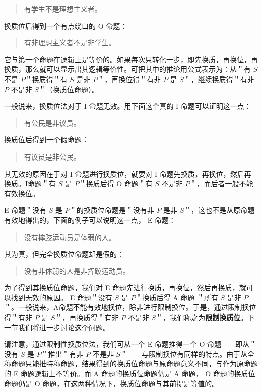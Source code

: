 \begin{quote}
有学生不是理想主义者。
\end{quote}

换质位后得到一个有点绕口的 O 命题：

\begin{quote}
有非理想主义者不是非学生。
\end{quote}

它与第一个命题在逻辑上是等价的。如果每次只转化一步，即先换质，再换位，再换质，那么就可以显示出其逻辑等价性。可把其中的推论用公式表示为：从＂有 $S$ 不是 $P$＂换质得＂有 $S$ 是非 $P$＂，再换位得＂有非 $P$ 是 $S$＂，继续换质得＂有非 $P$ 不是非 $S$＂（换质位命题）。

一般说来，换质位法对于 I 命题无效。用下面这个真的 I 命题可以证明这一点：

\begin{quote}
有公民是非议员。
\end{quote}

换质位后得到一个假命题：

\begin{quote}
有议员是非公民。
\end{quote}

其无效的原因在于对 I 命题进行换质位，就要对 I 命题先换质，再换位，然后再换质。I命题＂有 $S$ 是 $P$＂换质后得 O 命题＂有 $S$ 不是非 $P$＂，而后者一般不能有效换位。

E 命题＂没有 $S$ 是 $P$＂的换质位命题是＂没有非 $P$ 是非 $S$＂，这也不是从原命题有效地得出的，下面的例子可以说明这一点， E 命题：

\begin{quote}
没有摔跤运动员是体弱的人。
\end{quote}

其为真，但完全换质位命题却是假的：

\begin{quote}
没有非体弱的人是非挥跤运动员。
\end{quote}

为了得到其换质位命题，我们对 E 命题先进行换质，再换位，然后再换质，就可以找到无效的原因。 E 命题＂没有 $S$ 是 $P$＂换质后得 A 命题 ＂所有 $S$ 是非 $P$＂。一般说来，A命题不能有效地换位，除非进行限制换位。于是，通过限制换位得＂有非 $P$ 是 $S$＂，再换质得＂有非 $P$ 不是非 $S$＂，我们称之为\textbf{限制换质位}。下一节我们将进一步讨论这个问题。

请注意，通过限制性换质位法，我们可从一个 E 命题推得一个 O 命题——即从＂没有 $S$ 是 $P$＂推出＂有非 $P$ 不是非 $S$＂——与限制换位有同样的特点。由于从全称命题只能推特称命题，结果得到的换质位命题与原命题意义不同，与作为原命题的 E 命题逻辑上不等价。而 A 命题的换质位命题仍是 A 命题， O 命题的换质位命题仍是 O 命题，在这两种情况下，换质位命题与其前提是等值的。


